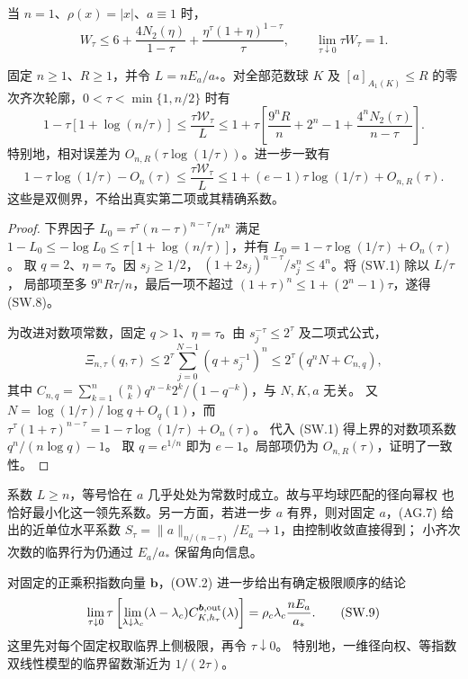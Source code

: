\begin{corollary}[一维幂权]\label{cor:small-homogeneity-one-dimensional}
当 $n=1$、$\rho(x)=|x|$、$a\equiv1$ 时，
\[
W_\tau\le6+\frac{4N_2(\eta)}{1-\tau}
+\frac{\eta^\tau(1+\eta)^{1-\tau}}{\tau},
\qquad\lim_{\tau\downarrow0}\tau W_\tau=1.
\]
\end{corollary}


\begin{corollary}[一致对数余项]\label{cor:small-homogeneity-uniform}
固定 $n\ge1$、$R\ge1$，并令 $L=nE_a/a_*$。对全部范数球 $K$ 及
$[a]_{A_1(K)}\le R$ 的零次齐次轮廓，$0<\tau<\min\{1,n/2\}$ 时有
\[
1-\tau[1+\log(n/\tau)]\le\frac{\tau\mathcal W_\tau}{L}
\le1+\tau\left[\frac{9^nR}{n}+2^n-1+
\frac{4^nN_2(\tau)}{n-\tau}\right]. \tag{SW.8}
\]
特别地，相对误差为 $O_{n,R}(\tau\log(1/\tau))$。进一步一致有
\[
1-\tau\log(1/\tau)-O_n(\tau)
\le\frac{\tau\mathcal W_\tau}{L}
\le1+(e-1)\tau\log(1/\tau)+O_{n,R}(\tau). \tag{SW.8a}
\]
这些是双侧界，不给出真实第二项或其精确系数。
\end{corollary}
\begin{proof}
下界因子 $L_0=\tau^\tau(n-\tau)^{n-\tau}/n^n$ 满足
$1-L_0\le-\log L_0\le\tau[1+\log(n/\tau)]$，并有
$L_0=1-\tau\log(1/\tau)+O_n(\tau)$。
取 $q=2$、$\eta=\tau$。因 $s_j\ge1/2$，
$(1+2s_j)^{n-\tau}/s_j^n\le4^n$。将 (SW.1) 除以 $L/\tau$，
局部项至多 $9^nR\tau/n$，最后一项不超过
$(1+\tau)^n\le1+(2^n-1)\tau$，遂得 (SW.8)。

为改进对数项常数，固定 $q>1$、$\eta=\tau$。由 $s_j^{-\tau}\le2^\tau$ 及二项式公式，
\[
\Xi_{n,\tau}(q,\tau)\le
2^\tau\sum_{j=0}^{N-1}(q+s_j^{-1})^n
\le2^\tau(q^nN+C_{n,q}),
\]
其中 $C_{n,q}=\sum_{k=1}^n\binom nk q^{n-k}2^k/(1-q^{-k})$，与 $N,K,a$ 无关。
又 $N=\log(1/\tau)/\log q+O_q(1)$，而
$\tau^\tau(1+\tau)^{n-\tau}=1-\tau\log(1/\tau)+O_n(\tau)$。
代入 (SW.1) 得上界的对数项系数 $q^n/(n\log q)-1$。
取 $q=e^{1/n}$ 即为 $e-1$。局部项仍为 $O_{n,R}(\tau)$，证明了一致性。
\end{proof}

系数 $L\ge n$，等号恰在 $a$ 几乎处处为常数时成立。故与平均球匹配的径向幂权
也恰好最小化这一领先系数。另一方面，若进一步 $a$ 有界，则对固定 $a$，(AG.7) 给出的近单位水平系数
$S_\tau=\|a\|_{n/(n-\tau)}/E_a\to1$，由控制收敛直接得到；
小齐次次数的临界行为仍通过 $E_a/a_*$ 保留角向信息。

对固定的正乘积指数向量 $\boldsymbol b$，(OW.2) 进一步给出有确定极限顺序的结论
\[
\lim_{\tau\downarrow0}\tau
\left[\lim_{\lambda\downarrow\lambda_c}(\lambda-\lambda_c)
C^{\boldsymbol b,\rm out}_{K,h_\tau}(\lambda)\right]
=\rho_c\lambda_c\frac{nE_a}{a_*}. \tag{SW.9}
\]
这里先对每个固定权取临界上侧极限，再令 $\tau\downarrow0$。
特别地，一维径向权、等指数双线性模型的临界留数渐近为 $1/(2\tau)$。

